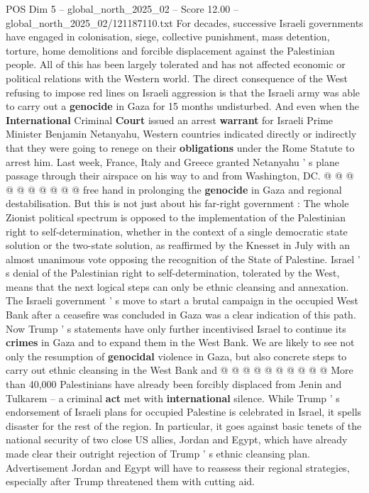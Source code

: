 \begin{textsample}{POS Dim 5 – global\_north\_2025\_02 – Score 12.00 – global\_north\_2025\_02/121187110.txt}
For decades, successive Israeli governments have engaged in colonisation, siege, collective punishment, mass detention, torture, home demolitions and forcible displacement against the Palestinian people.
All of this has been largely tolerated and has not affected economic or political relations with the Western world.
The direct consequence of the West refusing to impose red lines on Israeli aggression is that the Israeli army was able to carry out a \textbf{genocide} in Gaza for 15 months undisturbed.
And even when the \textbf{International} Criminal \textbf{Court} issued an arrest \textbf{warrant} for Israeli Prime Minister Benjamin Netanyahu, Western countries indicated directly or indirectly that they were going to renege on their \textbf{obligations} under the Rome Statute to arrest him.
Last week, France, Italy and Greece granted Netanyahu ' s plane passage through their airspace on his way to and from Washington, DC. @ @ @ @ @ @ @ @ @ @ free hand in prolonging the \textbf{genocide} in Gaza and regional destabilisation.
But this is not just about his far-right government : The whole Zionist political spectrum is opposed to the implementation of the Palestinian right to self-determination, whether in the context of a single democratic state solution or the two-state solution, as reaffirmed by the Knesset in July with an almost unanimous vote opposing the recognition of the State of Palestine.
Israel ' s denial of the Palestinian right to self-determination, tolerated by the West, means that the next logical steps can only be ethnic cleansing and annexation.
The Israeli government ' s move to start a brutal campaign in the occupied West Bank after a ceasefire was concluded in Gaza was a clear indication of this path.
Now Trump ' s statements have only further incentivised Israel to continue its \textbf{crimes} in Gaza and to expand them in the West Bank.
We are likely to see not only the resumption of \textbf{genocidal} violence in Gaza, but also concrete steps to carry out ethnic cleansing in the West Bank and @ @ @ @ @ @ @ @ @ @ More than 40,000 Palestinians have already been forcibly displaced from Jenin and Tulkarem -- a criminal \textbf{act} met with \textbf{international} silence.
While Trump ' s endorsement of Israeli plans for occupied Palestine is celebrated in Israel, it spells disaster for the rest of the region.
In particular, it goes against basic tenets of the national security of two close US allies, Jordan and Egypt, which have already made clear their outright rejection of Trump ' s ethnic cleansing plan.
Advertisement Jordan and Egypt will have to reassess their regional strategies, especially after Trump threatened them with cutting aid.

\end{textsample}
